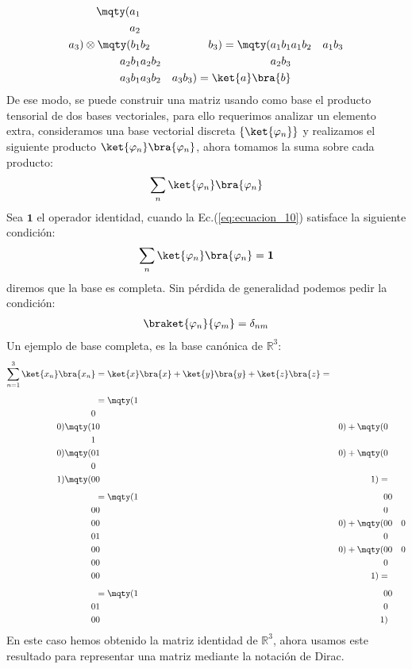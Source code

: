 \begin{align}
\mqty(a_{1} \\ a_{2} \\ a_{3}) \otimes \mqty(b_{1} & b_{2} & b_{3}) = \mqty(
a_{1} b_{1} & a_{1} b_{2} & a_{1} b_{3} \\
a_{2} b_{1} & a_{2} b_{2} & a_{2} b_{3} \\
a_{3} b_{1} & a_{3} b_{2} & a_{3} b_{3}
) = \ket{a} \bra{b}
\label{eq:ecuacion_09}
\end{align}
De ese modo, se puede construir una matriz usando como base el producto tensorial de dos bases vectoriales, para ello requerimos analizar un elemento extra, consideramos una base vectorial discreta $\left\{ \ket{\varphi_{n}} \right\} $ y realizamos el siguiente producto $\ket{\varphi_{n}} \bra{\varphi_{n}}$, ahora tomamos la suma sobre cada producto:
\begin{align}
\sum_{n} \ket{\varphi_{n}} \bra{\varphi_{n}}
\label{eq:ecuacion_10}
\end{align}
Sea $\mathbf{1}$ el operador identidad, cuando la Ec.(\ref{eq:ecuacion_10}) satisface la siguiente condición:
\begin{align}
\sum_{n} \ket{\varphi_{n}} \bra{\varphi_{n}} = \mathbf{1}
\label{eq:ecuacion_11}
\end{align}
diremos que la base es completa. Sin pérdida de generalidad podemos pedir la condición:
\begin{align*}
\braket{\varphi_{n}}{\varphi_{m}} = \delta_{nm}
\end{align*}
Un ejemplo de base completa, es la base canónica de $\mathbb{R}^{3}$:
\begin{align*}
\sum_{n=1}^{3} \ket{x_{n}} \bra{x_{n}} &= \ket{x} \bra{x} + \ket{y} \bra{y} + \ket{z} \bra{z} = \\[0.5em]
&=
\mqty(1 \\ 0 \\ 0) \mqty(1 & 0 & 0) + \mqty(0 \\ 1 \\ 0) \mqty(0 & 1 & 0) + \mqty(0 \\ 0 \\ 1) \mqty(0 & 0 & 1) = \\[0.5em]
&= 
\mqty(
1 & 0 & 0 \\
0 & 0 & 0 \\
0 & 0 & 0
) +
\mqty(
0 & 0 & 0 \\
0 & 1 & 0 \\
0 & 0 & 0
) + 
\mqty(
0 & 0 & 0 \\
0 & 0 & 0 \\
0 & 0 & 1
) = \\[0.5em]
&= \mqty(
1 & 0 & 0 \\
0 & 1 & 0 \\
0 & 0 & 1
)  
\end{align*}
En este caso hemos obtenido la matriz identidad de $\mathbb{R}^{3}$, ahora usamos este resultado para representar una matriz mediante la notación de Dirac.

